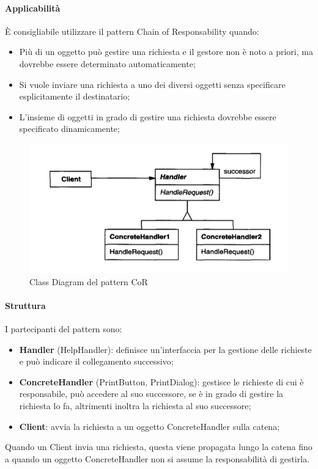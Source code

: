 \paragraph{Applicabilità} È consigliabile utilizzare il pattern Chain of Responsability quando:
\begin{itemize}
    \item Più di un oggetto può gestire una richiesta e il gestore non è noto a priori, ma dovrebbe essere determinato automaticamente;
    \item Si vuole inviare una richiesta a uno dei diversi oggetti senza specificare esplicitamente il destinatario;
    \item L'insieme di oggetti in grado di gestire una richiesta dovrebbe essere specificato dinamicamente;
\end{itemize}

\begin{figure}[H]
    \centering
    \includegraphics[width=0.5\linewidth]{assets/pattern/chain-of-responsability/cor-struttura.png}
    \caption{Class Diagram del pattern CoR}
\end{figure}

\paragraph{Struttura} I partecipanti del pattern sono:
\begin{itemize}
    \item  \textbf{Handler} (HelpHandler): definisce un'interfaccia per la gestione delle richieste e può indicare il collegamento successivo;
    \item \textbf{ConcreteHandler} (PrintButton, PrintDialog): gestisce le richieste di cui è responsabile, può accedere al suo successore, se è in grado di gestire la richiesta lo fa, altrimenti inoltra la richiesta al suo successore;
    \item \textbf{Client}: avvia la richiesta a un oggetto ConcreteHandler sulla catena;
\end{itemize}

Quando un Client invia una richiesta, questa viene propagata lungo la catena fino a quando un oggetto ConcreteHandler non si assume la responsabilità di gestirla.

